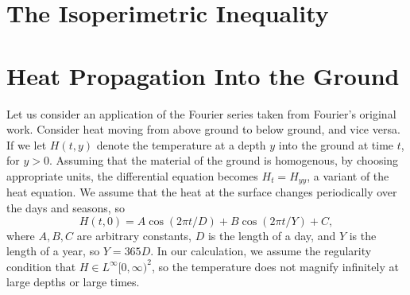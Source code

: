 
\section{The Isoperimetric Inequality}



\section{Heat Propagation Into the Ground}

Let us consider an application of the Fourier series taken from Fourier's original work. Consider heat moving from above ground to below ground, and vice versa. If we let $H(t,y)$ denote the temperature at a depth $y$ into the ground at time $t$, for $y > 0$. Assuming that the material of the ground is homogenous, by choosing appropriate units, the differential equation becomes $H_t = H_{yy}$, a variant of the heat equation. We assume that the heat at the surface changes periodically over the days and seasons, so
%
\[ H(t,0) = A \cos(2\pi t / D) + B \cos(2 \pi t/Y) + C, \]
%
where $A,B,C$ are arbitrary constants, $D$ is the length of a day, and $Y$ is the length of a year, so $Y = 365 D$. In our calculation, we assume the regularity condition that $H \in L^\infty [0,\infty)^2$, so the temperature does not magnify infinitely at large depths or large times.

